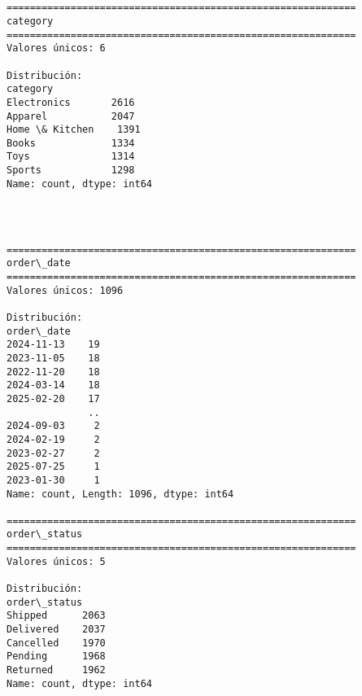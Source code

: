 \documentclass[11pt]{article}
\begin{document}
    \begin{center}
    \end{center}
    { \hspace*{\fill} \\}
    
    \begin{Verbatim}[commandchars=\\\{\}]

============================================================
category
============================================================
Valores únicos: 6

Distribución:
category
Electronics       2616
Apparel           2047
Home \& Kitchen    1391
Books             1334
Toys              1314
Sports            1298
Name: count, dtype: int64
    \end{Verbatim}

    \begin{center}
    \end{center}
    { \hspace*{\fill} \\}
    
    \begin{Verbatim}[commandchars=\\\{\}]

============================================================
order\_date
============================================================
Valores únicos: 1096

Distribución:
order\_date
2024-11-13    19
2023-11-05    18
2022-11-20    18
2024-03-14    18
2025-02-20    17
              ..
2024-09-03     2
2024-02-19     2
2023-02-27     2
2025-07-25     1
2023-01-30     1
Name: count, Length: 1096, dtype: int64

============================================================
order\_status
============================================================
Valores únicos: 5

Distribución:
order\_status
Shipped      2063
Delivered    2037
Cancelled    1970
Pending      1968
Returned     1962
Name: count, dtype: int64
    \end{Verbatim}

    \begin{center}
    \end{center}
    { \hspace*{\fill} \\}
    
\end{document}
